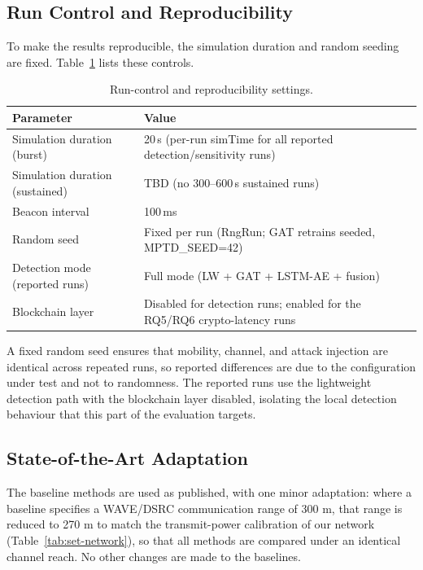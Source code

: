 \documentclass[12pt, a4paper]{report}
\begin{document}
\subsection{Run Control and Reproducibility}

To make the results reproducible, the simulation duration and random seeding are
fixed. Table~\ref{tab:set-run} lists these controls.

\begin{table}[H]
\centering
\caption{Run-control and reproducibility settings.}
\label{tab:set-run}
\begin{tabular}{|p{5.2cm}|p{8.8cm}|}
\hline
\textbf{Parameter} & \textbf{Value} \\
\hline
Simulation duration (burst)     & 20\,s (per-run simTime for all reported
                                  detection/sensitivity runs) \\
\hline
Simulation duration (sustained) & TBD (no 300--600\,s sustained runs) \\
\hline
Beacon interval                 & 100\,ms \\
\hline
Random seed                     & Fixed per run (RngRun; GAT retrains seeded, MPTD\_SEED=42) \\
\hline
Detection mode (reported runs)  & Full mode (LW + GAT + LSTM-AE + fusion) \\
\hline
Blockchain layer                & Disabled for detection runs; enabled for
                                  the RQ5/RQ6 crypto-latency runs \\
\hline
\end{tabular}
\end{table}

A fixed random seed ensures that mobility, channel, and attack injection are
identical across repeated runs, so reported differences are due to the
configuration under test and not to randomness. The reported runs use the
lightweight detection path with the blockchain layer disabled, isolating the
local detection behaviour that this part of the evaluation targets.

\subsection{State-of-the-Art Adaptation}

The baseline methods are used as published, with one minor adaptation: where a
baseline specifies a WAVE/DSRC communication range of 300 m, that range is
reduced to 270 m to match the transmit-power calibration of our network
(Table~\ref{tab:set-network}), so that all methods are compared under an
identical channel reach. No other changes are made to the baselines.
\end{document}

